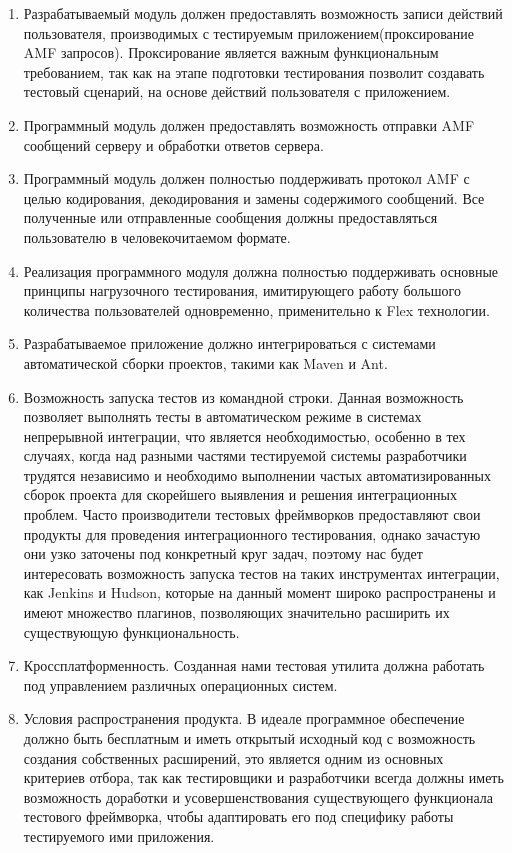 \begin{enumerate}
\item Разрабатываемый модуль должен предоставлять возможность записи действий пользователя,
производимых с тестируемым приложением(проксирование AMF запросов). Проксирование является важным функциональным
требованием, так как на этапе подготовки тестирования позволит создавать тестовый сценарий, на основе действий
пользователя с приложением.
\item Программный модуль должен предоставлять возможность отправки AMF сообщений серверу и обработки ответов сервера.
\item Программный модуль должен полностью поддерживать протокол AMF с целью кодирования, декодирования и замены
содержимого сообщений. Все полученные или отправленные сообщения должны предоставляться пользователю в человекочитаемом
формате.
\item Реализация программного модуля должна полностью поддерживать основные принципы нагрузочного тестирования,
имитирующего работу большого количества пользователей одновременно, применительно к Flex технологии.
\item Разрабатываемое приложение должно интегрироваться с системами автоматической сборки проектов, такими как Maven и Ant.
\item Возможность запуска тестов из командной строки. Данная возможность позволяет
выполнять тесты в автоматическом режиме в системах непрерывной интеграции, что
является необходимостью, особенно в тех случаях, когда над разными частями
тестируемой системы разработчики трудятся независимо и необходимо
выполнении частых автоматизированных сборок проекта для скорейшего
выявления и решения интеграционных проблем. Часто производители тестовых
фреймворков предоставляют свои продукты для проведения интеграционного тестирования, однако
зачастую они узко заточены под конкретный круг задач, поэтому нас будет интересовать
возможность запуска тестов на таких инструментах интеграции, как Jenkins и
Hudson, которые на данный момент широко распространены и имеют множество плагинов, позволяющих
значительно расширить их существующую функциональность.
\item Кроссплатформенность. Созданная нами тестовая утилита должна работать
под управлением различных операционных систем.
\item Условия распространения продукта. В идеале программное обеспечение должно быть
бесплатным и иметь открытый исходный код с возможность создания собственных расширений,
это является одним из основных критериев отбора, так как тестировщики и разработчики
всегда должны иметь возможность доработки и усовершенствования существующего функционала
тестового фреймворка, чтобы адаптировать его под специфику работы тестируемого ими приложения.
\end{enumerate}

